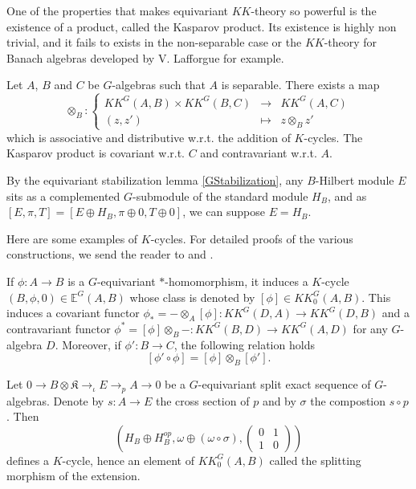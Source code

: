 One of the properties that makes equivariant $KK$-theory so powerful is the existence of a product, called the Kasparov product. Its existence is highly non trivial, and it fails to exists in the non-separable case or the $KK$-theory for Banach algebras developed by V. Lafforgue \cite{Lafforgue} for example.

\begin{prop}\cite{LeGall} Let $A$, $B$ and $C$ be $G$-algebras such that $A$ is separable. There exists a map 
\[\otimes_B :\left\{\begin{array}{ccc} KK^G(A,B)\times KK^G(B,C) & \rightarrow & KK^G(A,C) \\ (z,z') & \mapsto & z\otimes_B z' \end{array}\right. \]
which is associative and distributive w.r.t. the addition of $K$-cycles. The Kasparov product is covariant w.r.t. $C$ and contravariant w.r.t. $A$.
\end{prop}

\begin{rk}
By the equivariant stabilization lemma \ref{GStabilization}, any $B$-Hilbert module $E$ sits as a complemented $G$-submodule of the standard module $H_B$, and as $[E,\pi,T] = [E \oplus H_B,\pi\oplus 0,T\oplus 0]$, we can suppose $E = H_B$.
\end{rk}

Here are some examples of $K$-cycles. For detailed proofs of the various constructions, we send the reader to \cite{blackadar} and \cite{LeGall}.

\begin{Expl}
If $\phi : A\rightarrow B$ is a $G$-equivariant $*$-homomorphism, it induces a $K$-cycle $(B,\phi,0)\in \mathbb E^G(A,B)$ whose class is denoted by $[\phi]\in KK_0^G(A,B)$. This induces a covariant functor $\phi_* = - \otimes_A [\phi] : KK^G(D,A)\rightarrow KK^G(D,B)$ and a contravariant functor $\phi^*=  [\phi] \otimes_B - : KK^G(B,D)\rightarrow KK^G(A,D)$ for any $G$-algebra $D$. Moreover, if $\phi' : B\rightarrow C$, the following relation holds 
\[ [\phi'\circ \phi] = [\phi]\otimes_B [\phi'].\]
\end{Expl}

\begin{Expl} Let $0 \rightarrow B\otimes \mathfrak K \rightarrow_\iota E \rightarrow_p A \rightarrow 0 $ be a $G$-equivariant split exact sequence of $G$-algebras. Denote by $s : A \rightarrow E$ the cross section of $p$ and by $\sigma $ the compostion $s\circ p$. Then 
\[(H_B \oplus H_B^{op},\omega \oplus (\omega \circ \sigma ), \begin{pmatrix} 0 & 1 \\ 1 & 0\end{pmatrix} )\] 
defines a $K$-cycle, hence an element of $KK_0^G(A,B)$ called the splitting morphism of the extension. %
\end{Expl}

